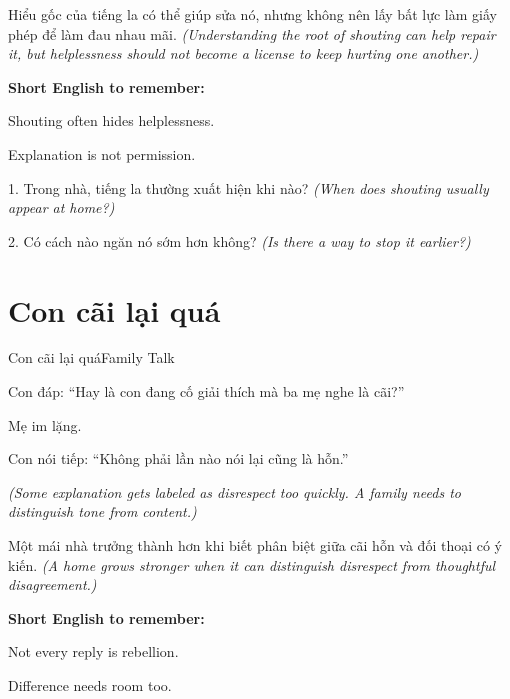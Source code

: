 \begin{baihoc}
Hiểu gốc của tiếng la có thể giúp sửa nó, nhưng không nên lấy bất lực làm giấy phép để làm đau nhau mãi.
\textit{(Understanding the root of shouting can help repair it, but helplessness should not become a license to keep hurting one another.)}
\end{baihoc}

\begin{ghinhoanh}
\textbf{Short English to remember:}

Shouting often hides helplessness.

Explanation is not permission.
\end{ghinhoanh}

\begin{tuhocnhanh}
1. Trong nhà, tiếng la thường xuất hiện khi nào? \textit{(When does shouting usually appear at home?)}

2. Có cách nào ngăn nó sớm hơn không? \textit{(Is there a way to stop it earlier?)}
\end{tuhocnhanh}
\ngancach

\section{Con cãi lại quá}
\begin{truyen}{Con cãi lại quá}{Family Talk}

Con đáp: ``Hay là con đang cố giải thích mà ba mẹ nghe là cãi?''

Mẹ im lặng.

Con nói tiếp: ``Không phải lần nào nói lại cũng là hỗn.''

\textit{(Some explanation gets labeled as disrespect too quickly. A family needs to distinguish tone from content.)}
\end{truyen}

\begin{baihoc}
Một mái nhà trưởng thành hơn khi biết phân biệt giữa cãi hỗn và đối thoại có ý kiến.
\textit{(A home grows stronger when it can distinguish disrespect from thoughtful disagreement.)}
\end{baihoc}

\begin{ghinhoanh}
\textbf{Short English to remember:}

Not every reply is rebellion.

Difference needs room too.
\end{ghinhoanh}

